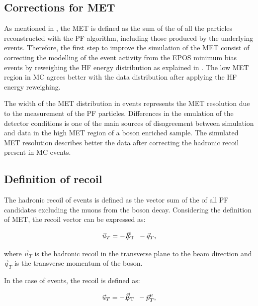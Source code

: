 \subsection{Corrections for MET} \label{sec:WBoson_Corrections_MET}

As mentioned in , the MET is defined as the sum of the \pt of all the particles reconstructed with the PF algorithm, including those produced by the underlying events. Therefore, the first step to improve the simulation of the MET consist of correcting the modelling of the event activity from the EPOS minimum bias events by reweighing the HF energy distribution as explained in . The low MET region in MC agrees better with the data distribution after applying the HF energy reweighing.

The width of the MET distribution in \ZToMuMu events represents the MET resolution due to the \pt measurement of the PF particles. Differences in the emulation of the detector conditions is one of the main sources of disagreement between simulation and data in the high MET region of a \Z boson enriched sample. The simulated MET resolution describes better the data after correcting the hadronic recoil present in MC events.

\subsection{Definition of recoil} \label{sec:WBoson_Corrections_RecoilCorrection}

The hadronic recoil of \ZToMuMu events is defined as the vector sum of the \pt of all PF candidates excluding the muons from the boson decay. Considering the definition of MET, the recoil vector can be expressed as:

\begin{equation}\label{eq:equT} 
\vec{u}_{T} = -{\vec E}_{\mathrm{T}}\hspace{-1.1em}/\kern0.45em\ \ - \vec{q}_{T},
\end{equation}

where $\vec{u}_{T}$ is the hadronic recoil in the transverse plane to the beam direction and $\vec{q}_{T}$ is the transverse momentum of the \Z boson.

In the case of \WToMuNu events, the recoil is defined as:

\begin{equation}\label{eq:equTW}
\vec{u}_{T} = -{\vec E}_{\mathrm{T}}\hspace{-1.1em}/\kern0.45em\ \ - \vec{p}_{T}^{\mu},
\end{equation}

